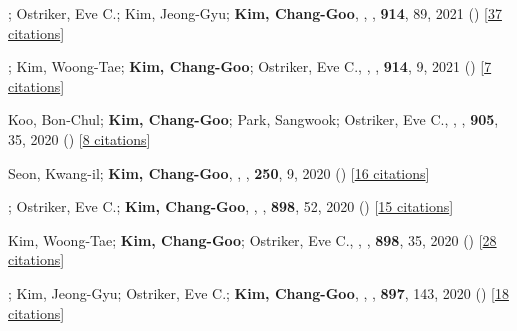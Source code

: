 \item[{23.}]; Ostriker, Eve C.; Kim, Jeong-Gyu; \textbf{Kim, Chang-Goo}, , \apj, \textbf{914}, 89, 2021 () [\href{http://adsabs.harvard.edu/abs/2021ApJ...914...89L}{37 citations}]

\item[{24.}]; Kim, Woong-Tae; \textbf{Kim, Chang-Goo}; Ostriker, Eve C., , \apj, \textbf{914}, 9, 2021 () [\href{http://adsabs.harvard.edu/abs/2021ApJ...914....9M}{7 citations}]

\item[{25.}]Koo, Bon-Chul; \textbf{Kim, Chang-Goo}; Park, Sangwook; Ostriker, Eve C., , \apj, \textbf{905}, 35, 2020 () [\href{http://adsabs.harvard.edu/abs/2020ApJ...905...35K}{8 citations}]

\item[{26.}]Seon, Kwang-il; \textbf{Kim, Chang-Goo}, , \apjs, \textbf{250}, 9, 2020 () [\href{http://adsabs.harvard.edu/abs/2020ApJS..250....9S}{16 citations}]

\item[{27.}]; Ostriker, Eve C.; \textbf{Kim, Chang-Goo}, , \apj, \textbf{898}, 52, 2020 () [\href{http://adsabs.harvard.edu/abs/2020ApJ...898...52M}{15 citations}]

\item[{28.}]Kim, Woong-Tae; \textbf{Kim, Chang-Goo}; Ostriker, Eve C., , \apj, \textbf{898}, 35, 2020 () [\href{http://adsabs.harvard.edu/abs/2020ApJ...898...35K}{28 citations}]

\item[{29.}]; Kim, Jeong-Gyu; Ostriker, Eve C.; \textbf{Kim, Chang-Goo}, , \apj, \textbf{897}, 143, 2020 () [\href{http://adsabs.harvard.edu/abs/2020ApJ...897..143K}{18 citations}]

